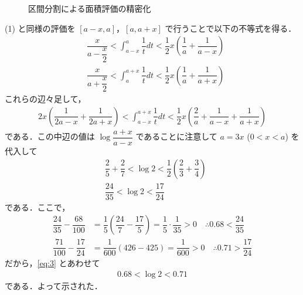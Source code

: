 \documentclass[../../main.tex]{subfiles}
\begin{document}
\begin{figure}[htb]
  \caption{区間分割による面積評価の精密化}
  \label{fig:subdivided_trapezoid_evaluation}
\end{figure}

(1) と同様の評価を $[a-x, a]$，$[a, a+x]$ で行うことで以下の不等式を得る．
\begin{align}
  & \dfrac{x}{a - \dfrac{x}{2}} < \int_{a-x}^a \dfrac{1}{t} dt < \dfrac{1}{2} x \left( \dfrac{1}{a} + \dfrac{1}{a-x} \right) \\
  & \dfrac{x}{a + \dfrac{x}{2}} < \int_a^{a+x} \dfrac{1}{t} dt < \dfrac{1}{2} x \left( \dfrac{1}{a} + \dfrac{1}{a+x} \right)
\end{align}
これらの辺々足して，
\begin{align}
  2x \left( \dfrac{1}{2a-x} + \dfrac{1}{2a+x} \right) < \int_{a-x}^{a+x} \dfrac{1}{t} dt < \dfrac{1}{2} x \left( \dfrac{2}{a} + \dfrac{1}{a-x} + \dfrac{1}{a+x} \right) \label{eq:2}
\end{align}
である．この中辺の値は $\log \dfrac{a+x}{a-x}$ であることに注意して $a=3x$ ($0 < x < a$) を代入して
\begin{align}
  & \dfrac{2}{5} + \dfrac{2}{7} < \log 2 < \dfrac{1}{2} \left( \dfrac{2}{3} + \dfrac{3}{4} \right) \\
  & \dfrac{24}{35} < \log 2 < \dfrac{17}{24} \label{eq:3}
\end{align}
である．ここで，
\begin{align}
  \dfrac{24}{35} - \dfrac{68}{100}
  &= \dfrac{1}{5} \left( \dfrac{24}{7} - \dfrac{17}{5} \right)
  = \dfrac{1}{5} \cdot \dfrac{1}{35} > 0 \quad \therefore 0.68 < \dfrac{24}{35} \\
  \dfrac{71}{100} - \dfrac{17}{24}
  &= \dfrac{1}{600} (426 - 425)
  = \dfrac{1}{600} > 0 \quad \therefore 0.71 > \dfrac{17}{24}
\end{align}
だから，\cref{eq:3} とあわせて
\begin{align}
  0.68 < \log 2 < 0.71
\end{align}
である．よって示された．
\end{document}
